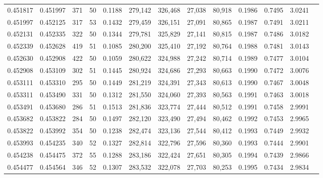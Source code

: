 \begin{tabular}{rrrrrrrrrrrrr}
0.451817 & 0.451997 &   371 &  50 &                                     0.1188 & 279,142 & 326,468 &  27,038 &  80,918 & 0.1986 & 0.7495 & 3.0241 \\
0.451997 & 0.452125 &   317 &  53 &                                     0.1432 & 279,459 & 326,151 &  27,091 &  80,865 & 0.1987 & 0.7491 & 3.0211 \\
0.452131 & 0.452335 &   322 &  50 &                                     0.1344 & 279,781 & 325,829 &  27,141 &  80,815 & 0.1987 & 0.7486 & 3.0182 \\
0.452339 & 0.452628 &   419 &  51 &                                     0.1085 & 280,200 & 325,410 &  27,192 &  80,764 & 0.1988 & 0.7481 & 3.0143 \\
0.452630 & 0.452908 &   422 &  50 &                                     0.1059 & 280,622 & 324,988 &  27,242 &  80,714 & 0.1989 & 0.7477 & 3.0104 \\
0.452908 & 0.453109 &   302 &  51 &                                     0.1445 & 280,924 & 324,686 &  27,293 &  80,663 & 0.1990 & 0.7472 & 3.0076 \\
0.453111 & 0.453310 &   295 &  50 &                                     0.1449 & 281,219 & 324,391 &  27,343 &  80,613 & 0.1990 & 0.7467 & 3.0048 \\
0.453311 & 0.453490 &   331 &  50 &                                     0.1312 & 281,550 & 324,060 &  27,393 &  80,563 & 0.1991 & 0.7463 & 3.0018 \\
0.453491 & 0.453680 &   286 &  51 &                                     0.1513 & 281,836 & 323,774 &  27,444 &  80,512 & 0.1991 & 0.7458 & 2.9991 \\
0.453682 & 0.453822 &   284 &  50 &                                     0.1497 & 282,120 & 323,490 &  27,494 &  80,462 & 0.1992 & 0.7453 & 2.9965 \\
0.453822 & 0.453992 &   354 &  50 &                                     0.1238 & 282,474 & 323,136 &  27,544 &  80,412 & 0.1993 & 0.7449 & 2.9932 \\
0.453993 & 0.454235 &   340 &  52 &                                     0.1327 & 282,814 & 322,796 &  27,596 &  80,360 & 0.1993 & 0.7444 & 2.9901 \\
0.454238 & 0.454475 &   372 &  55 &                                     0.1288 & 283,186 & 322,424 &  27,651 &  80,305 & 0.1994 & 0.7439 & 2.9866 \\
0.454477 & 0.454564 &   346 &  52 &                                     0.1307 & 283,532 & 322,078 &  27,703 &  80,253 & 0.1995 & 0.7434 & 2.9834 \\

\end{tabular}
